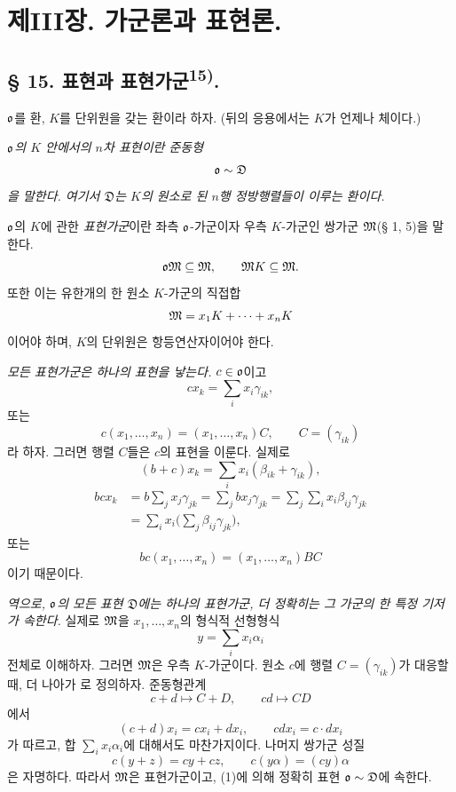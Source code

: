 \section*{제III장. 가군론과 표현론.}

\subsection*{§ 15. 표현과 표현가군\textsuperscript{15)}.}

\(\mathfrak o\)를 환, \(K\)를 단위원을 갖는 환이라 하자. (뒤의 응용에서는 \(K\)가 언제나 체이다.)

\emph{\(\mathfrak o\)의 \(K\) 안에서의 \(n\)차 표현이란 준동형}
\[
        \mathfrak o\sim\mathfrak D
\]
\emph{을 말한다. 여기서 \(\mathfrak D\)는 \(K\)의 원소로 된 \(n\)행 정방행렬들이 이루는 환이다.}

\(\mathfrak o\)의 \(K\)에 관한 \emph{표현가군}이란 좌측 \(\mathfrak o\)-가군이자 우측 \(K\)-가군인 쌍가군 \(\mathfrak M\)(§ 1, 5)을 말한다.
\[
        \mathfrak o\mathfrak M\subseteq\mathfrak M,
        \qquad
        \mathfrak M K\subseteq\mathfrak M.
\]
또한 이는 유한개의 한 원소 \(K\)-가군의 직접합
\[
        \mathfrak M=x_1K+\cdots+x_nK
\]
이어야 하며, \(K\)의 단위원은 항등연산자이어야 한다.

\emph{모든 표현가군은 하나의 표현을 낳는다.} \(c\in\mathfrak o\)이고
\[
        cx_k=\sum_i x_i\gamma_{ik},
\]
또는
\[
        c(x_1,\ldots,x_n)=(x_1,\ldots,x_n)C,
        \qquad C=(\gamma_{ik})
\]
라 하자. 그러면 행렬 \(C\)들은 \(c\)의 표현을 이룬다. 실제로
\[
        (b+c)x_k=\sum_i x_i(\beta_{ik}+\gamma_{ik}),
\]
\[
\begin{aligned}
        bcx_k
        &=b\sum_jx_j\gamma_{jk}
          =\sum_j bx_j\gamma_{jk}
          =\sum_j\sum_i x_i\beta_{ij}\gamma_{jk}\\
        &=\sum_i x_i\biggl(\sum_j\beta_{ij}\gamma_{jk}\biggr),
\end{aligned}
\]
또는
\[
        bc(x_1,\ldots,x_n)=(x_1,\ldots,x_n)BC
\]
이기 때문이다.

\emph{역으로, \(\mathfrak o\)의 모든 표현 \(\mathfrak D\)에는 하나의 표현가군, 더 정확히는 그 가군의 한 특정 기저가 속한다.} 실제로 \(\mathfrak M\)을 \(x_1,\ldots,x_n\)의 형식적 선형형식
\[
        y=\sum_i x_i\alpha_i
\]
전체로 이해하자. 그러면 \(\mathfrak M\)은 우측 \(K\)-가군이다. 원소 \(c\)에 행렬 \(C=(\gamma_{ik})\)가 대응할 때, 더 나아가
로 정의하자. 준동형관계
\[
        c+d\longmapsto C+D,
        \qquad cd\longmapsto CD
\]
에서
\[
        (c+d)x_i=cx_i+dx_i,
        \qquad cdx_i=c\cdot dx_i
\]
가 따르고, 합 \(\sum_i x_i\alpha_i\)에 대해서도 마찬가지이다. 나머지 쌍가군 성질
\[
        c(y+z)=cy+cz,
        \qquad c(y\alpha)=(cy)\alpha
\]
은 자명하다. 따라서 \(\mathfrak M\)은 표현가군이고, (1)에 의해 정확히 표현 \(\mathfrak o\sim\mathfrak D\)에 속한다.

